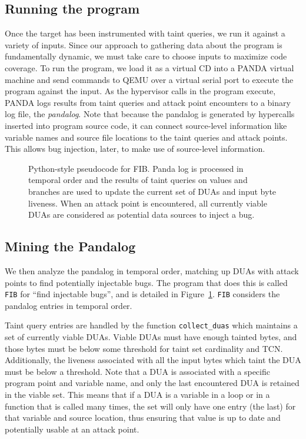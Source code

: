 \subsection{Running the program}
Once the target has been instrumented with taint queries, we run it against a variety of inputs.
Since our approach to gathering data about the program is fundamentally dynamic, we must take care to choose inputs to maximize code coverage.
To run the program, we load it as a virtual CD into a PANDA virtual machine and send commands to QEMU over a virtual serial port to execute the program against the input.
As the hypervisor calls in the program execute, PANDA logs results from taint queries and attack point encounters to a binary log file, the \emph{pandalog}.
Note that because the pandalog is generated by hypercalls inserted into program source code, it can connect source-level information like variable names and source file locations to the taint queries and attack points.
This allows bug injection, later, to make use of source-level information. 


\begin{figure}

\caption{Python-style pseudocode for FIB. 
Panda log is processed in temporal order and the results of taint queries on values and branches are 
used to update the current set of DUAs and input byte liveness.
When an attack point is encountered, all currently viable DUAs are considered as potential data sources to inject a bug.}
\label{alg:fib}
\end{figure}

\subsection{Mining the Pandalog}
\label{sec:mining}

We then analyze the pandalog in temporal order, matching up DUAs with attack points to find potentially injectable bugs.
The program that does this is called \verb+FIB+ for ``find injectable bugs'', and is detailed in Figure~\ref{alg:fib}.
\verb+FIB+ considers the pandalog entries in temporal order.

Taint query entries are handled by the function \verb+collect_duas+ which maintains a set of currently viable DUAs.
Viable DUAs must have enough tainted bytes, and those bytes must be below some threshold for taint set cardinality and TCN.
Additionally, the liveness associated with all the input bytes which taint the DUA must be below a threshold.
Note that a DUA is associated with a specific program point and variable name, and only the last encountered DUA is retained in the viable set. 
This means that if a DUA is a variable in a loop or in a function that is called many times, the set will only have one entry (the last) for that variable and source location, thus ensuring that value is up to date and potentially usable at an attack point.  


